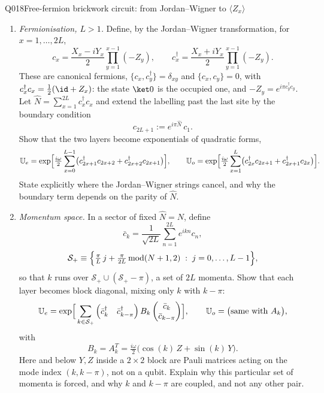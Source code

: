 \begin{entry}{Q018}{Free-fermion brickwork circuit: from Jordan--Wigner to $\langle Z_x\rangle$}
\begin{problem}
\begin{enumerate}[label=\textbf{(\alph*)},leftmargin=*]
  \item \emph{Fermionisation, $L>1$.} Define, by the Jordan--Wigner transformation,
        for $x=1,\dots,2L$,
        \[
          c_x=\frac{X_x-iY_x}{2}\prod_{y=1}^{x-1}(-Z_y) ,
          \qquad
          c^{\dagger}_x=\frac{X_x+iY_x}{2}\prod_{y=1}^{x-1}(-Z_y) .
        \]
        These are canonical fermions, $\{c_x,c^{\dagger}_y\}=\delta_{xy}$ and
        $\{c_x,c_y\}=0$, with $c^{\dagger}_xc_x=\tfrac12(\id+Z_x)$: the state $\ket0$
        is the occupied one, and $-Z_y=e^{i\pi c^{\dagger}_yc_y}$. Let
        $\hat N=\sum_{x=1}^{2L}c^{\dagger}_xc_x$ and extend the labelling past the
        last site by the boundary condition
        \[
          c_{2L+1}:=e^{i\pi\hat N}\,c_1 .
        \]
        Show that the two layers become exponentials of quadratic forms,
        \[
          \mathbb U_e=\exp\Bigl[\tfrac{i\omega}{2}\sum_{x=0}^{L-1}
            \bigl(c^{\dagger}_{2x+1}c_{2x+2}+c^{\dagger}_{2x+2}c_{2x+1}\bigr)\Bigr],
          \qquad
          \mathbb U_o=\exp\Bigl[\tfrac{i\omega}{2}\sum_{x=1}^{L}
            \bigl(c^{\dagger}_{2x}c_{2x+1}+c^{\dagger}_{2x+1}c_{2x}\bigr)\Bigr].
        \]
        State explicitly where the Jordan--Wigner strings cancel, and why the boundary
        term depends on the parity of $\hat N$.
 
  \item \emph{Momentum space.} In a sector of fixed $\hat N=N$, define
        \[
          \bar c_k=\frac{1}{\sqrt{2L}}\sum_{n=1}^{2L}e^{ikn}c_n ,
        \]
        \[
          \mathcal S_+\equiv\Bigl\{\tfrac{\pi}{L}\,j+\tfrac{\pi}{2L}\,\mathrm{mod}(N+1,2)
            \;:\; j=0,\dots,L-1\Bigr\},
        \]
        so that $k$ runs over $\mathcal S_+\cup(\mathcal S_+-\pi)$, a set of $2L$
        momenta. Show that each layer becomes block diagonal, mixing only $k$ with
        $k-\pi$:
        \[
          \mathbb U_e=\exp\Bigl[\,\sum_{k\in\mathcal S_+}
            \begin{pmatrix}\bar c^{\dagger}_k&\bar c^{\dagger}_{k-\pi}\end{pmatrix}
            B_k
            \begin{pmatrix}\bar c_k\\ \bar c_{k-\pi}\end{pmatrix}\Bigr],
          \qquad
          \mathbb U_o=\bigl(\text{same with }A_k\bigr),
        \]
        with
        \[
          B_k=A_k^{T}=\tfrac{i\omega}{2}\bigl(\cos(k)\,Z+\sin(k)\,Y\bigr).
        \]
        Here and below $Y,Z$ inside a $2\times2$ block are Pauli matrices acting on
        the mode index $(k,k-\pi)$, not on a qubit. Explain why this particular set
        of momenta is forced, and why $k$ and $k-\pi$ are coupled, and not any other
        pair.
 

\end{enumerate}
\end{problem}
\end{entry}
